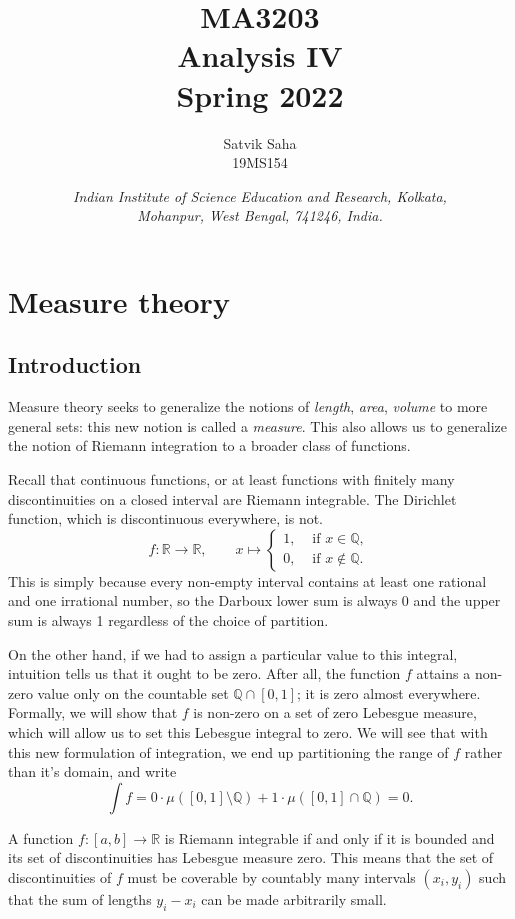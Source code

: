 \documentclass[11pt]{article}
\title{
    \Large\textsc{MA3203} \\
    \Huge \textbf{Analysis IV} \\
    \vspace{5pt}
    \Large{Spring 2022}
}
\author{
    \large Satvik Saha
    \\\textsc{\small 19MS154}
}
\date{\normalsize
    \textit{Indian Institute of Science Education and Research, Kolkata, \\
    Mohanpur, West Bengal, 741246, India.} \\
}
\newcommand{\R}{\mathbb{R}}
\newcommand{\Q}{\mathbb{Q}}
\theoremstyle{definition}
\theoremstyle{remark}
\numberwithin{equation}{section}
\begin{document}
    \maketitle

    \tableofcontents

    \section{Measure theory}

    \subsection{Introduction}
    Measure theory seeks to generalize the notions of \emph{length}, \emph{area},
    \emph{volume} to more general sets: this new notion is called a \emph{measure}.
    This also allows us to generalize the notion of Riemann integration to a broader
    class of functions.

    Recall that continuous functions, or at least functions with finitely many
    discontinuities on a closed interval are Riemann integrable. The Dirichlet
    function, which is discontinuous everywhere, is not. \[
        f\colon \R \to \R, \qquad x \mapsto \begin{cases}
            1, &\text{ if } x \in \Q, \\
            0, &\text{ if } x \notin \Q.
        \end{cases}
    \] This is simply because every non-empty interval contains at least one rational
    and one irrational number, so the Darboux lower sum is always 0 and the upper sum
    is always 1 regardless of the choice of partition.

    On the other hand, if we had to assign a particular value to this integral,
    intuition tells us that it ought to be zero. After all, the function $f$ attains
    a non-zero value only on the countable set $\Q \cap [0, 1]$; it is zero almost
    everywhere. Formally, we will show that $f$ is non-zero on a set of zero
    Lebesgue measure, which will allow us to set this Lebesgue integral to zero. We
    will see that with this new formulation of integration, we end up partitioning
    the range of $f$ rather than it's domain, and write \[
        \int f = 0\cdot \mu([0, 1]\setminus \Q) + 1\cdot \mu([0, 1] \cap \Q) = 0.
    \]

    \begin{theorem}
        A function $f\colon [a, b] \to \R$ is Riemann integrable if and only if it is
        bounded and its set of discontinuities has Lebesgue measure zero. This means
        that the set of discontinuities of $f$ must be coverable by countably many
        intervals $(x_i, y_i)$ such that the sum of lengths $y_i - x_i$ can be made
        arbitrarily small.
    \end{theorem}
\end{document}
